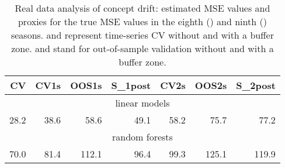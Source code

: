 \begin{table}[ht]
\centering
\caption{Real data analysis of concept drift: estimated MSE values and proxies for the true MSE values in the eighth ({}) and ninth ({}) seasons. {} and {} represent time-series CV without and with a buffer zone. {} and {} stand for out-of-sample validation without and with a buffer zone.}
\begin{tabular}{rrrrrrr}
  \hline
  CV & CV1s & OOS1s & S\_1post & CV2s & OOS2s & S\_2post \\
  \hline
  \multicolumn{7}{c}{linear models} \\
  \hline
   28.2 & 38.6 & 58.6 & 49.1 & 58.2 & 75.7 & 77.2  \\
  \hline
  \multicolumn{7}{c}{random forests} \\
  \hline
    70.0 &  81.4 & 112.1 &  96.4 &  99.3 & 125.1 & 119.9  \\
  \hline
\end{tabular}
\label{tab:concdriftrealdatamse}
\end{table}
